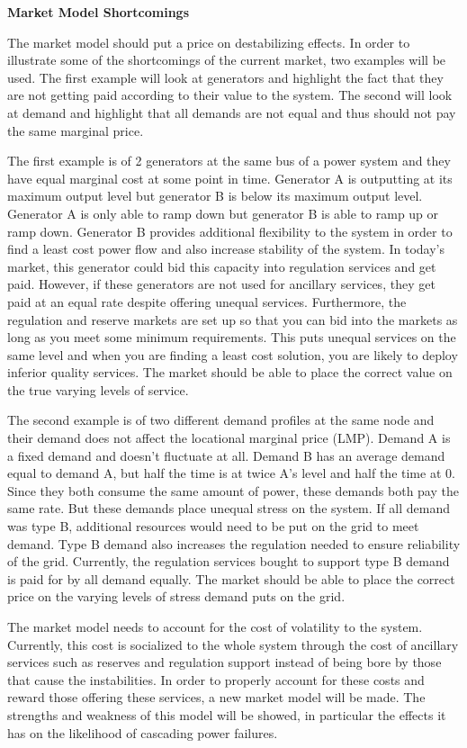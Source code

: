 \textbf{Market Model Shortcomings}

The market model should put a price on destabilizing effects.  In order to illustrate some of the shortcomings of the current market, two examples will be used.  The first example will look at generators and highlight the fact that they are not getting paid according to their value to the system.  The second will look at demand and highlight that all demands are not equal and thus should not pay the same marginal price.

The first example is of 2 generators at the same bus of a power system and they have equal marginal cost at some point in time.  Generator A is outputting at its maximum output level but generator B is below its maximum output level.  Generator A is only able to ramp down but generator B is able to ramp up or ramp down.  Generator B provides additional flexibility to the system in order to find a least cost power flow and also increase stability of the system.  In today's market, this generator could bid this capacity into regulation services and get paid.  However, if these generators are not used for ancillary services, they get paid at an equal rate despite offering unequal services.   Furthermore, the regulation and reserve markets are set up so that you can bid into the markets as long as you meet some minimum requirements.  This puts unequal services on the same level and when you are finding a least cost solution, you are likely to deploy inferior quality services.  The market should be able to place the correct value on the true varying levels of service.

The second example is of two different demand profiles at the same node and their demand does not affect the locational marginal price (LMP).  Demand A is a fixed demand and doesn't fluctuate at all.  Demand B has an average demand equal to demand A, but half the time is at twice A's level and half the time at 0.  Since they both consume the same amount of power, these demands both pay the same rate.  But these demands place unequal stress on the system.  If all demand was type B, additional resources would need to be put on the grid to meet demand.  Type B demand also increases the regulation needed to ensure reliability of the grid.  Currently, the regulation services bought to support type B demand is paid for by all demand equally.  The market should be able to place the correct price on the varying levels of stress demand puts on the grid.     

The market model needs to account for the cost of volatility to the system.  Currently, this cost is socialized to the whole system through the cost of ancillary services such as reserves and regulation support instead of being bore by those that cause the instabilities.  In order to properly account for these costs and reward those offering these services, a new market model will be made.  The strengths and weakness of this model will be showed, in particular the effects it has on the likelihood of  cascading power failures.

